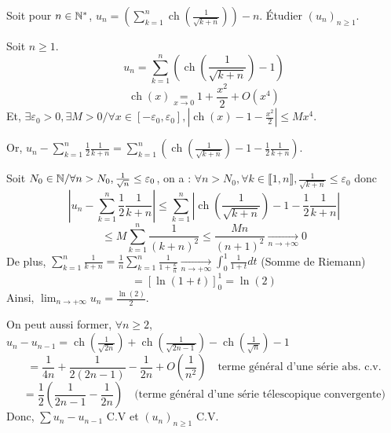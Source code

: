 
\begin{statementbox}
Soit pour $n \in \mathbb N^*$, $u_n = \left( \sum_{k=1}^n \operatorname{ch}\left( \frac{1}{\sqrt{k+n}} \right) \right) - n$.
Étudier $(u_n)_{n \geq 1}$.
\end{statementbox}

\begin{solution}
Soit $n \geq 1$.
\[
u_n = \sum_{k=1}^n \left( \operatorname{ch}\left( \frac{1}{\sqrt{k+n}} \right) - 1 \right)
\]
\[
\operatorname{ch}(x) \underset{x \to 0}{=} 1 + \frac{x^2}{2} + O(x^4)
\]
Et, $\exists \varepsilon_0 > 0, \exists M > 0 / \forall x \in [-\varepsilon_0, \varepsilon_0], \left| \operatorname{ch}(x) - 1 - \frac{x^2}{2} \right| \leq M x^4$.

Or, $u_n - \sum_{k=1}^n \frac{1}{2} \frac{1}{k+n} = \sum_{k=1}^n \left( \operatorname{ch}\left( \frac{1}{\sqrt{k+n}} \right) - 1 - \frac{1}{2} \frac{1}{k+n} \right)$.

Soit $N_0 \in \mathbb N / \forall n > N_0, \frac{1}{\sqrt{n}} \leq \varepsilon_0$, on a :
$\forall n > N_0, \forall k \in \llbracket 1, n \rrbracket, \frac{1}{\sqrt{k+n}} \leq \varepsilon_0$ donc
\[
\left| u_n - \sum_{k=1}^n \frac{1}{2} \frac{1}{k+n} \right| \leq \sum_{k=1}^n \left| \operatorname{ch}\left( \frac{1}{\sqrt{k+n}} \right) - 1 - \frac{1}{2} \frac{1}{k+n} \right|
\]
\[
\leq M \sum_{k=1}^n \frac{1}{(k+n)^2} \leq \frac{M n}{(n+1)^2} \xrightarrow[n \to +\infty]{} 0
\]
De plus, $\sum_{k=1}^n \frac{1}{k+n} = \frac{1}{n} \sum_{k=1}^n \frac{1}{1 + \frac{k}{n}} \xrightarrow[n \to +\infty]{} \int_0^1 \frac{1}{1+t} dt$ (Somme de Riemann)
\[
= [\ln(1+t)]_0^1 = \ln(2)
\]
Ainsi, $\lim_{n \to +\infty} u_n = \frac{\ln(2)}{2}$.

\begin{remarkbox}
On peut aussi former, $\forall n \geq 2$, $u_n - u_{n-1} = \operatorname{ch}\left( \frac{1}{\sqrt{2n}} \right) + \operatorname{ch}\left( \frac{1}{\sqrt{2n-1}} \right) - \operatorname{ch}\left( \frac{1}{\sqrt{n}} \right) - 1$
\[
= \frac{1}{4n} + \frac{1}{2(2n-1)} - \frac{1}{2n} + O\left(\frac{1}{n^2}\right) \quad \text{terme général d'une série abs. c.v.}
\]
\[
= \frac{1}{2} \left( \frac{1}{2n-1} - \frac{1}{2n} \right) \quad \text{(terme général d'une série télescopique convergente)}
\]
Donc, $\sum u_n - u_{n-1}$ C.V et $(u_n)_{n \geq 1}$ C.V.
\end{remarkbox}
\end{solution}


